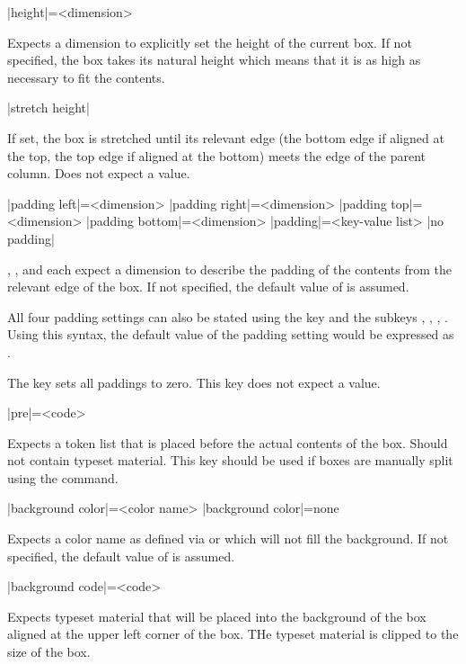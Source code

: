 \documentclass[a4paper]{article}
\begin{document}
\begin{macrodef}
|height|={<dimension>}
\end{macrodef}
Expects a dimension to explicitly set the height of the current box. If not specified, the box takes its natural height which means that it is as high as necessary to fit the contents.

\begin{macrodef}
|stretch height|
\end{macrodef}
If set, the box is stretched until its relevant edge (the bottom edge if aligned at the top, the top edge if aligned at the bottom) meets the edge of the parent column. Does not expect a value.

\begin{macrodef}
|padding left|={<dimension>}
|padding right|={<dimension>}
|padding top|={<dimension>}
|padding bottom|={<dimension>}
|padding|={<key-value list>}
|no padding|
\end{macrodef}
, ,  and  each expect a dimension to describe the padding of the contents from the relevant edge of the box. If not specified, the default value of \macro{7.5mm} is assumed.

All four padding settings can also be stated using the  key and the subkeys , , , . Using this syntax, the default value of the padding setting would be expressed as .

The key  sets all paddings to zero. This key does not expect a value.

\begin{macrodef}
|pre|={<code>}
\end{macrodef}
Expects a token list that is placed before the actual contents of the box. Should not contain typeset material. This key should be used if boxes are manually split using the \macro{\leporelloboxbreak} command.

\begin{macrodef}
|background color|={<color name>}
|background color|={none}
\end{macrodef}
Expects a color name as defined via  or  which will not fill the background. If not specified, the default value of  is assumed.

\begin{macrodef}
|background code|={<code>}
\end{macrodef}
Expects typeset material that will be placed into the background of the box aligned at the upper left corner of the box. THe typeset material is clipped to the size of the box.
\end{document}
